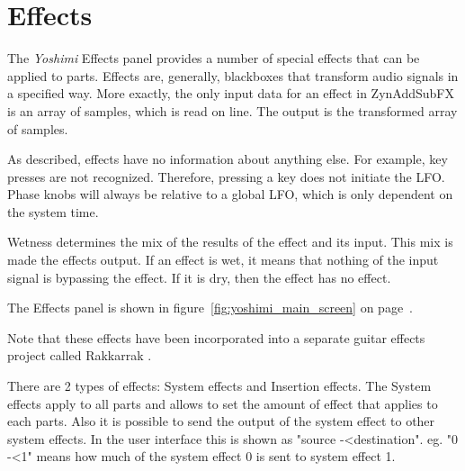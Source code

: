 %
%
%

\section{Effects}
\label{sec:effects}

   The \textsl{Yoshimi} Effects panel provides a number of special effects
   that can be applied to parts.
   Effects are, generally, blackboxes that transform audio signals in a
   specified way. More exactly, the only input data for an effect in
   ZynAddSubFX is an array of samples, which is read on line.
   The output is the transformed array of samples.

   As described, effects have no information about anything else. For
   example, key presses are not recognized. Therefore, pressing a key does
   not initiate the LFO. Phase knobs will always be relative to a global LFO,
   which is only dependent on the system time.

   Wetness determines the mix of the results of the effect and its input.
   This mix is made the effects output. If an effect is wet, it means that
   nothing of the input signal is bypassing the effect. If it is dry, then
   the effect has no effect.

   The Effects panel is shown in
   figure~\ref{fig:yoshimi_main_screen} on
   page~\pageref{fig:yoshimi_main_screen}.

   Note that these effects have been incorporated into a separate
   guitar effects project called Rakkarrak \cite{rakarrack}.

   There are 2 types of effects: System effects and Insertion effects. The
   System effects apply to all parts and allows to set the amount of effect
   that applies to each parts. Also it is possible to send the output of the
   system effect to other system effects. In the user interface this is shown
   as "source -\textless destination". eg. "0 -\textless 1" means how much of
   the system effect 0 is sent to system effect 1.

